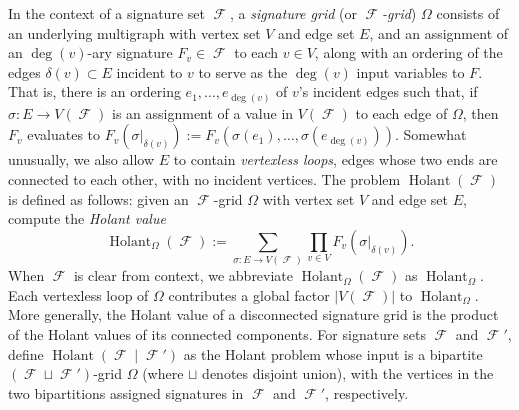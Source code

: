 \documentclass{article}
\DeclareMathOperator{\fc}{\mathcal{F}}
\DeclareMathOperator{\holant}{Holant}
\begin{document}
In the context of a signature set $\fc$, a
\emph{signature grid} (or \emph{$\fc$-grid}) $\Omega$ consists of an underlying multigraph with 
vertex set $V$ and edge set $E$, and an assignment of an $\deg(v)$-ary signature $F_v \in \fc$ 
to each $v \in V$, along with an ordering of the edges $\delta(v) \subset E$ incident to $v$ 
to serve as the
$\deg(v)$ input variables to $F$. That is, there is an ordering $e_1,\ldots,e_{\deg(v)}$ of $v$'s 
incident edges such that, if $\sigma: E \to V(\fc)$ is an assignment of a value in $V(\fc)$ to each
edge of $\Omega$, then $F_v$ evaluates to 
$F_v(\sigma|_{\delta(v)}) := F_v(\sigma(e_1),\ldots,\sigma(e_{\deg(v)}))$.
Somewhat unusually, we also allow $E$ to contain \emph{vertexless loops}, edges whose two ends are 
connected to each other, with no incident vertices.
The problem $\holant(\fc)$ is defined as follows: given an $\fc$-grid $\Omega$
with vertex set $V$ and edge set $E$, compute the \emph{Holant value}
\begin{equation}
    \holant_\Omega(\fc) := \sum_{\sigma: E \to V(\fc)} \prod_{v \in V} F_v(\sigma|_{\delta(v)}).
    \label{eq:holant}
\end{equation}
When $\fc$ is clear from context, we abbreviate $\holant_\Omega(\fc)$ as 
$\holant_\Omega$. Each vertexless loop of $\Omega$ contributes a global factor $|V(\fc)|$ to
$\holant_\Omega$. More generally, the Holant value of a disconnected signature grid
is the product of the Holant values of its connected components.
For signature sets $\fc$ and $\fc'$, define $\holant(\fc \mid \fc')$ as the Holant problem 
whose input is a bipartite $(\fc\sqcup\fc')$-grid
$\Omega$ (where $\sqcup$ denotes disjoint union), with the vertices in the two bipartitions 
assigned signatures in $\fc$ and $\fc'$, respectively.
\end{document}
